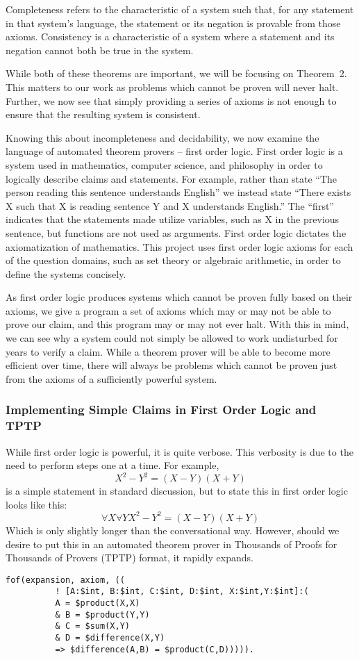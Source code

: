\noindent
Completeness refers to the characteristic of a system such that, for any statement in that system's language, the statement or its negation is provable from those axioms. Consistency is a characteristic of a system where a statement and its negation cannot both be true in the system.

While both of these theorems are important, we will be focusing on Theorem~2. This matters to our work as problems which cannot be proven will never halt. Further, we now see that simply providing a series of axioms is not enough to ensure that the resulting system is consistent.

Knowing this about incompleteness and decidability, we now examine the language of automated theorem provers -- first order logic. First order logic is a system used in mathematics, computer science, and philosophy in order to logically describe claims and statements. For example, rather than state ``The person reading this sentence understands English'' we instead state ``There exists X such that X is reading sentence Y and X understands English.'' The ``first'' indicates that the statements made utilize variables, such as X in the previous sentence, but functions are not used as arguments. First order logic dictates the axiomatization of mathematics. This project uses first order logic axioms for each of the question domains, such as set theory or algebraic arithmetic, in order to define the systems concisely.

As first order logic produces systems which cannot be proven fully based on their axioms, we give a program a set of axioms which may or may not be able to prove our claim, and this program may or may not ever halt. With this in mind, we can see why a system could not simply be allowed to work undisturbed for years to verify a claim. While a theorem prover will be able to become more efficient over time, there will always be problems which cannot be proven just from the axioms of a sufficiently powerful system.

\subsubsection{Implementing Simple Claims in First Order Logic and TPTP}

While first order logic is powerful, it is quite verbose. This verbosity is due to the need to perform steps one at a time. For example, \[X^2-Y^2 = (X-Y)(X+Y)\] is a simple statement in standard discussion, but to state this in first order logic looks like this:
\[\forall X \forall Y X^2-Y^2 = (X-Y)(X+Y) \]
\noindent
Which is only slightly longer than the conversational way. However, should we desire to put this in an automated theorem prover in Thousands of Proofs for Thousands of Provers (TPTP) format, it rapidly expands.
\begin{lstlisting}
fof(expansion, axiom, ((
          ! [A:$int, B:$int, C:$int, D:$int, X:$int,Y:$int]:(
          A = $product(X,X)
          & B = $product(Y,Y)
          & C = $sum(X,Y)     
          & D = $difference(X,Y)
          => $difference(A,B) = $product(C,D))))).
\end{lstlisting}

